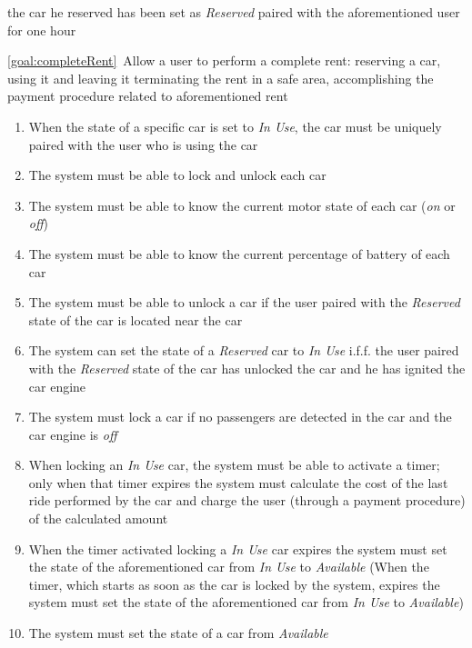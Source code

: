 \begin{description}
\begin{enumerate}[resume*]
  				the car he reserved has been set as \emph{Reserved} paired with the aforementioned
  				user for one hour
   			\end{enumerate}
  		\item \ref{goal:completeRent}\ Allow a user to perform a complete rent: reserving a car, using it and leaving it terminating the rent in a safe area, accomplishing the payment procedure related to aforementioned rent
  			\begin{enumerate}[resume*]
  			 	\item When the state of a specific car is set to \emph{In Use}, the car must be
 	  			uniquely paired with the user who is using the car
  				\item The system must be able to lock and unlock each car
  				\item The system must be able to know the current motor state of each car
  				(\emph{on} or \emph{off})
  				\item The system must be able to know the current percentage of battery of each car
  				\item The system must be able to unlock a car if the user paired with the
  				\emph{Reserved} state of the car is located near  the car
  				\item The system can set the state of a \emph{Reserved} car to \emph{In Use} i.f.f.
  				the user paired with the \emph{Reserved} state of the car has unlocked the car and he
  				has ignited the car engine
  				\item The system must lock a car if no passengers are detected in the car and the car
  				engine is \emph{off}
  				\item When locking  an \emph{In Use} car, the system must be able to activate a timer;
  				only when that timer expires the system must calculate the cost of the last ride
  				performed by the car and charge the user (through a payment procedure) of the calculated
  				amount
  				\item When the timer activated locking a \emph{In Use} car expires the system must
  				set the state of the aforementioned car from \emph{In Use} to \emph{Available}
  				(When the timer, which starts as soon as the car is locked by the system, expires the
  				system must set the state of the aforementioned car from \emph{In Use} to
  				\emph{Available})
  				\item The system must set the state of a car from \emph{Available}

\end{enumerate}
\end{description}
